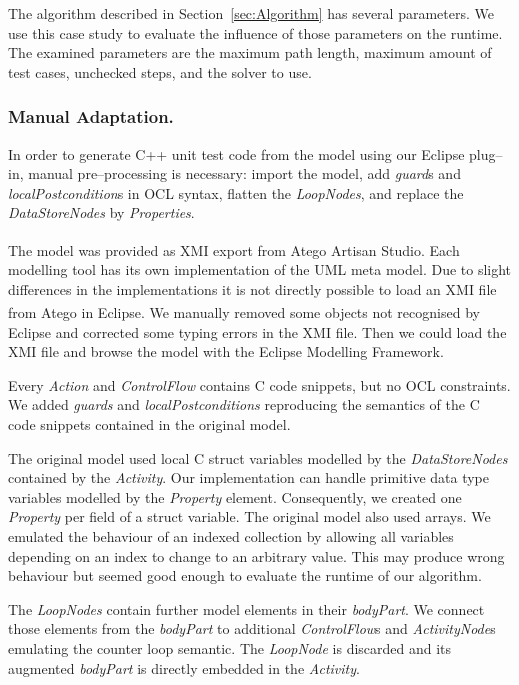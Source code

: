 \documentclass[runningheads,a4paper]{llncs}%
\newcommand{\UMLType}[1]{\textsf{\textit{#1}}} %
\newcommand{\UMLReference}[1]{\textsf{\textit{#1}}} %
\begin{document}
The algorithm described in Section~\ref{sec:Algorithm} has several parameters.
We use this case study to evaluate the influence of those parameters on the
runtime. The examined parameters are the maximum path length, maximum amount of
test cases, unchecked steps, and the solver to use.
\subsubsection{Manual Adaptation.}
In order to generate C++ unit test code from the model using our Eclipse plug--in, 
manual pre--processing is necessary: import the model, add \UMLReference{guard}s and
\UMLReference{localPostcondition}s in OCL syntax, flatten the
\UMLType{LoopNodes}, and replace the \UMLType{DataStoreNodes} by
\UMLType{Properties}.

The model was provided as XMI export from Atego\textsuperscript{\textregistered}
Artisan Studio. Each modelling tool has its own implementation of the UML meta
model. Due to slight differences in the implementations it is not directly
possible to load an XMI file from Atego\textsuperscript{\textregistered} in
Eclipse. We manually removed some objects not recognised by Eclipse and
corrected some typing errors in the XMI file. Then we could load the XMI file
and browse the model with the Eclipse Modelling Framework.

Every \UMLType{Action} and \UMLReference{ControlFlow} contains C code snippets,
but no OCL constraints. We added
\UMLReference{guards} and \UMLReference{localPostconditions} reproducing the
semantics of the C code snippets contained in the original model.

The original model used local C struct variables modelled by the
\UMLType{DataStoreNodes} contained by the \UMLType{Activity}. Our implementation
can handle primitive data type variables modelled by the \UMLType{Property}
element. Consequently, we created one \UMLType{Property} per field of a struct
variable. The original model also used arrays. We emulated the behaviour of an
indexed collection by allowing all variables depending on an index to change to
an arbitrary value. This may produce wrong
behaviour but seemed good enough to evaluate the runtime of our algorithm.

The \UMLType{LoopNodes} contain further model elements in their
\UMLReference{bodyPart}. We connect those elements from the
\UMLReference{bodyPart} to additional \UMLType{ControlFlow}s and
\UMLType{ActivityNode}s emulating the counter loop semantic. The
\UMLType{LoopNode} is discarded and its augmented \UMLReference{bodyPart} is
directly embedded in the \UMLType{Activity}.
\end{document}
